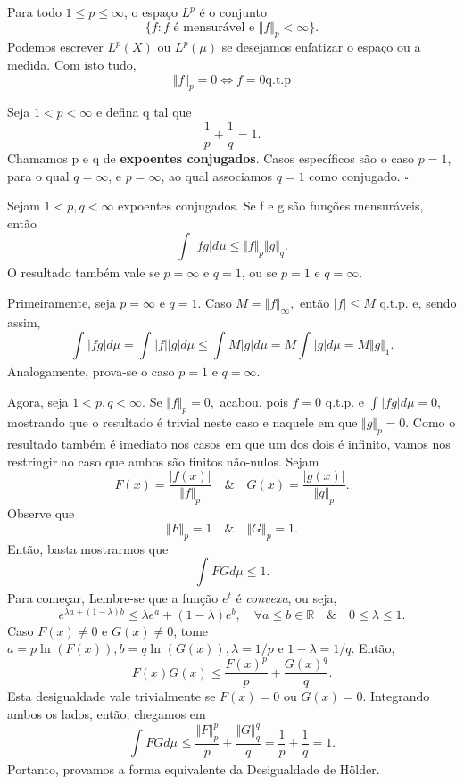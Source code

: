 \documentclass[measure_theory.tex]{subfiles}
\begin{document}
Para todo \(1\leq p\leq \infty\), o espaço \(L^{p}\) é o conjunto
\[
	\{f: f \text{ é mensurável e }\Vert f \Vert_{p}<\infty\}.
\]
Podemos escrever \(L^{p}(X)\) ou \(L^{p}(\mu )\) se desejamos enfatizar o espaço ou a medida. Com isto tudo,
\[
	\Vert f \Vert_{p} = 0 \Longleftrightarrow f = 0 \mathrm{q.t.p}
\]
\begin{def*}
	Seja \(1 < p < \infty\) e defina q tal que
	\[
		\frac{1}{p} + \frac{1}{q} = 1.
	\]
	Chamamos p e q de \textbf{expoentes conjugados}. Casos específicos são o caso \(p =1 \), para o qual \(q=\infty\), e \(p = \infty\), ao qual associamos \(q = 1\) como conjugado. \(\square\)
\end{def*}
\hypertarget{holder}{
	\begin{prop*}
		Sejam \(1 < p, q < \infty\) expoentes conjugados. Se f e g são funções mensuráveis, então
		\[
			\int_{}^{}|fg|d\mu \leq \Vert f \Vert_{p}\Vert g \Vert_{q}.
		\]
		O resultado também vale se \(p=\infty\) e \(q=1\), ou se \(p = 1\) e \(q=\infty\).
	\end{prop*}
}
\begin{proof*}
	Primeiramente, seja \(p=\infty\) e \(q=1\). Caso \(M = \Vert f \Vert_{\infty},\) então \(|f|\leq M\) q.t.p. e, sendo assim,
	\[
		\int_{}^{}|fg|d\mu = \int_{}^{}|f||g|d\mu \leq \int_{}^{}M|g|d\mu = M \int_{}^{}|g|d\mu = M \Vert g \Vert_{1}.
	\]
	Analogamente, prova-se o caso \(p=1\) e \(q=\infty\).

	Agora, seja \(1 < p, q < \infty\). Se \(\Vert f \Vert_{p} = 0,\) acabou, pois \(f=0\) q.t.p. e \(\int_{}^{}|fg|d\mu  = 0,\) mostrando que o resultado é trivial neste caso e naquele em que \(\Vert g \Vert_{p} = 0.\) Como
	o resultado também é imediato nos casos em que um dos dois é infinito, vamos nos restringir ao caso que ambos são finitos não-nulos. Sejam
	\[
		F(x) = \frac{|f(x)|}{\Vert f \Vert_{p}}\quad\&\quad G(x) = \frac{|g(x)|}{\Vert g \Vert_{p}}.
	\]
	Observe que
	\[
		\Vert F \Vert_{p} = 1\quad\&\quad \Vert G \Vert_{p} = 1.
	\]
	Então, basta mostrarmos que
	\[
		\int_{}^{}FGd\mu \leq 1.
	\]
	Para começar, Lembre-se que a função \(e^{t}\) é \textit{convexa}, ou seja,
	\[
		e^{\lambda a + (1-\lambda )b}\leq \lambda e^{a}+(1-\lambda )e^{b},\quad \forall a\leq b\in \mathbb{R}\quad\&\quad 0\leq \lambda \leq 1.
	\]
	Caso \(F(x)\neq0\) e \(G(x)\neq0\), tome \(a = p \ln^{}{(F(x))}, b = q\ln^{}{(G(x))}, \lambda = 1/p\) e \(1-\lambda =1/q.\) Então,
	\[
		F(x)G(x)\leq \frac{F(x)^{p}}{p} + \frac{G(x)^{q}}{q}.
	\]
	Esta desigualdade vale trivialmente se \(F(x) = 0\) ou \(G(x) = 0.\) Integrando ambos os lados, então, chegamos em
	\[
		\int_{}FG d\mu_{}\leq \frac{\Vert F \Vert_{p}^{p}}{p}+\frac{\Vert G \Vert_{q}^{q}}{q} = \frac{1}{p} + \frac{1}{q} = 1.
	\]
	Portanto, provamos a forma equivalente da Desigualdade de Hölder. \qedsymbol
\end{proof*}
\end{document}
